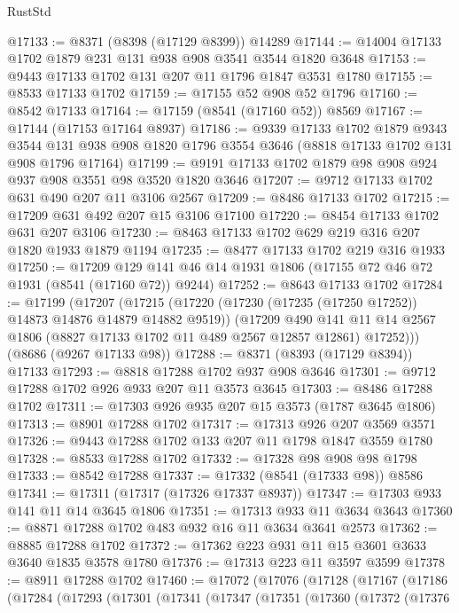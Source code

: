 \begin{lexlean}{RustStd}
\begin{coremodule}
@17133 := @8371 (@8398 (@17129 @8399)) @14289
@17144 := @14004 @17133 @1702 @1879 @231 @131 @938 @908 @3541 @3544 @1820 @3648
@17153 := @9443 @17133 @1702 @131 @207 @11 @1796 @1847 @3531 @1780
@17155 := @8533 @17133 @1702
@17159 := @17155 @52 @908 @52 @1796
@17160 := @8542 @17133
@17164 := @17159 (@8541 (@17160 @52)) @8569
@17167 := @17144 (@17153 @17164 @8937)
@17186 := @9339
    @17133
    @1702
    @1879
    @9343
    @3544
    @131
    @938
    @908
    @1820
    @1796
    @3554
    @3646
    (@8818 @17133 @1702 @131 @908 @1796 @17164)
@17199 := @9191 @17133 @1702 @1879 @98 @908 @924 @937 @908 @3551 @98 @3520 @1820 @3646
@17207 := @9712 @17133 @1702 @631 @490 @207 @11 @3106 @2567
@17209 := @8486 @17133 @1702
@17215 := @17209 @631 @492 @207 @15 @3106 @17100
@17220 := @8454 @17133 @1702 @631 @207 @3106
@17230 := @8463 @17133 @1702 @629 @219 @316 @207 @1820 @1933 @1879 @1194
@17235 := @8477 @17133 @1702 @219 @316 @1933
@17250 := @17209 @129 @141 @46 @14 @1931 @1806 (@17155 @72 @46 @72 @1931 (@8541 (@17160 @72)) @9244)
@17252 := @8643 @17133 @1702
@17284 := @17199
    (@17207
      (@17215
        (@17220 (@17230 (@17235 (@17250 @17252)) @14873 @14876 @14879 @14882 @9519))
        (@17209
          @490
          @141
          @11
          @14
          @2567
          @1806
          (@8827 @17133 @1702 @11 @489 @2567 @12857 @12861)
          @17252)))
    (@8686 (@9267 @17133 @98))
@17288 := @8371 (@8393 (@17129 @8394)) @17133
@17293 := @8818 @17288 @1702 @937 @908 @3646
@17301 := @9712 @17288 @1702 @926 @933 @207 @11 @3573 @3645
@17303 := @8486 @17288 @1702
@17311 := @17303 @926 @935 @207 @15 @3573 (@1787 @3645 @1806)
@17313 := @8901 @17288 @1702
@17317 := @17313 @926 @207 @3569 @3571
@17326 := @9443 @17288 @1702 @133 @207 @11 @1798 @1847 @3559 @1780
@17328 := @8533 @17288 @1702
@17332 := @17328 @98 @908 @98 @1798
@17333 := @8542 @17288
@17337 := @17332 (@8541 (@17333 @98)) @8586
@17341 := @17311 (@17317 (@17326 @17337 @8937))
@17347 := @17303 @933 @141 @11 @14 @3645 @1806
@17351 := @17313 @933 @11 @3634 @3643
@17360 := @8871 @17288 @1702 @483 @932 @16 @11 @3634 @3641 @2573
@17362 := @8885 @17288 @1702
@17372 := @17362 @223 @931 @11 @15 @3601 @3633 @3640 @1835 @3578 @1780
@17376 := @17313 @223 @11 @3597 @3599
@17378 := @8911 @17288 @1702
@17460 := @17072
    (@17076
      (@17128
        (@17167
          (@17186
            (@17284
              (@17293
                (@17301
                  (@17341
                    (@17347
                      (@17351
                        (@17360
                          (@17372
                            (@17376

\end{coremodule}
\end{lexlean}
